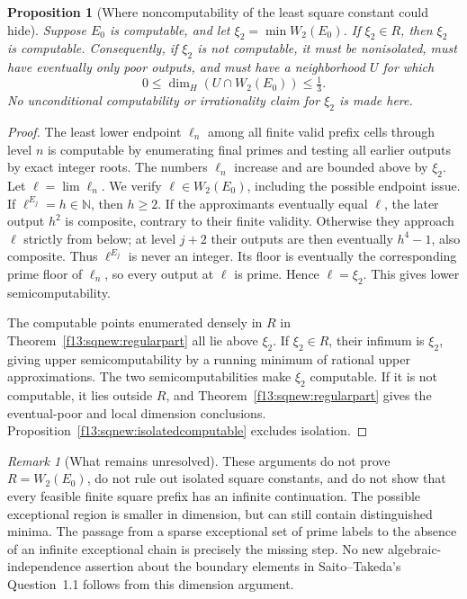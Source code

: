 \documentclass[11pt,a4paper]{article}
\newtheorem{proposition}[theorem]{Proposition}
\theoremstyle{definition}
\theoremstyle{remark}
\newtheorem{remark}[theorem]{Remark}
\numberwithin{equation}{section}
\begin{document}
\begin{proposition}[Where noncomputability of the least square constant could hide]
\label{f13:sqnew:minimumcriterion}
Suppose $E_0$ is computable, and let $\xi_2=\min W_2(E_0)$.
If $\xi_2\in R$, then $\xi_2$ is computable. Consequently, if $\xi_2$
is not computable, it must be nonisolated, must have eventually only
poor outputs, and must have a neighborhood $U$ for which
\[
 0\le\dim_H(U\cap W_2(E_0))\le\tfrac13.
\]
No unconditional computability or irrationality claim for $\xi_2$ is
made here.
\end{proposition}
\begin{proof}
The least lower endpoint $\ell_n$ among all finite valid prefix cells
through level $n$ is computable by enumerating final primes and testing
all earlier outputs by exact integer roots. The numbers $\ell_n$
increase and are bounded above by $\xi_2$.
Let $\ell=\lim\ell_n$. We verify $\ell\in W_2(E_0)$, including the
possible endpoint issue. If $\ell^{E_j}=h\in\mathbb N$, then $h\ge2$.
If the approximants eventually equal $\ell$, the later output
$h^2$ is composite, contrary to their finite validity. Otherwise they
approach $\ell$ strictly from below; at level $j+2$ their outputs are
then eventually $h^4-1$, also composite. Thus $\ell^{E_j}$ is never an
integer. Its floor is eventually the corresponding prime floor of
$\ell_n$, so every output at $\ell$ is prime. Hence $\ell=\xi_2$.
This gives lower semicomputability.

The computable points enumerated densely in $R$ in
Theorem~\ref{f13:sqnew:regularpart} all lie above $\xi_2$. If $\xi_2\in R$,
their infimum is $\xi_2$, giving upper semicomputability by a running
minimum of rational upper approximations. The two semicomputabilities
make $\xi_2$ computable. If it is not computable, it lies outside $R$,
and Theorem~\ref{f13:sqnew:regularpart} gives the eventual-poor and local
dimension conclusions. Proposition~\ref{f13:sqnew:isolatedcomputable}
excludes isolation.
\end{proof}

\begin{remark}[What remains unresolved]
These arguments do not prove $R=W_2(E_0)$, do not rule out isolated
square constants, and do not show that every feasible finite square
prefix has an infinite continuation. The possible exceptional region
is smaller in dimension, but can still contain distinguished minima.
The passage from a sparse exceptional set of prime labels to the
absence of an infinite exceptional chain is precisely the missing step.
No new algebraic-independence assertion about the boundary elements in
Saito--Takeda's Question~1.1 follows from this dimension argument.
\end{remark}
\end{document}
